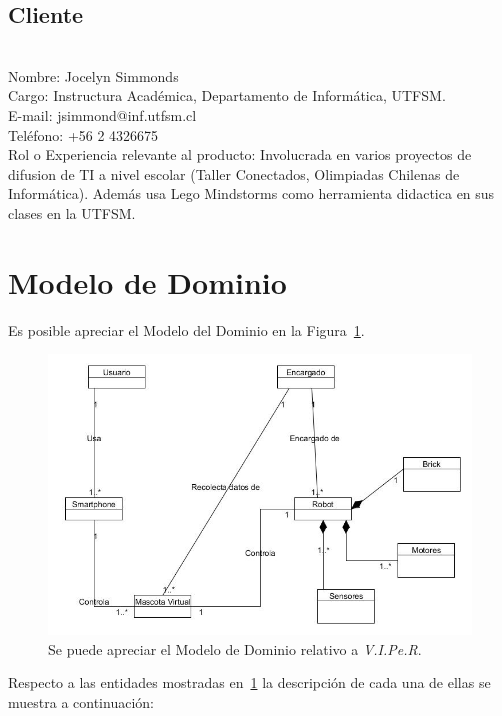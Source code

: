 \documentclass[letterpaper,12pt]{article} %
\numberwithin{equation}{section} %
\numberwithin{figure}{section} %
\numberwithin{table}{section} %
\begin{document}
\subsection{Cliente}
~\\
Nombre: Jocelyn Simmonds\\
Cargo: Instructura Acad\'emica, Departamento de Inform\'atica, UTFSM.\\
E-mail: jsimmond@inf.utfsm.cl\\
Tel\'efono: +56 2 4326675\\
Rol o Experiencia relevante al producto: Involucrada en varios proyectos de difusion de TI a nivel escolar (Taller Conectados, Olimpiadas Chilenas de Inform\'atica). Adem\'as usa Lego Mindstorms como herramienta didactica en sus clases en la UTFSM.

\newpage
\section{Modelo de Dominio}

Es posible apreciar el Modelo del Dominio en la Figura~\ref{fig:ModeloDominio}.

\begin{figure}[H]
   \centering
     \includegraphics[scale=0.45]{ModeloDominio.jpg}
   \caption{Se puede apreciar el Modelo de Dominio relativo a \emph{V.I.Pe.R}.}
   \label{fig:ModeloDominio}
\end{figure}

Respecto a las entidades mostradas en~\ref{fig:ModeloDominio} la descripci\'on de cada una de ellas se muestra a continuaci\'on:\\
\end{document}
